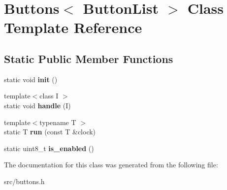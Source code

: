 \hypertarget{classButtons}{}\section{Buttons$<$ Button\+List $>$ Class Template Reference}
\label{classButtons}
\subsection*{Static Public Member Functions}
\begin{DoxyCompactItemize}
\item 
static void {\bfseries init} ()\hypertarget{classButtons_a9abcc4273029325408f8a0284434ffe7}{}\label{classButtons_a9abcc4273029325408f8a0284434ffe7}

\item 
{\footnotesize template$<$class I $>$ }\\static void {\bfseries handle} (I)\hypertarget{classButtons_a91d50739c18ae74d71e0c8821ecb3342}{}\label{classButtons_a91d50739c18ae74d71e0c8821ecb3342}

\item 
{\footnotesize template$<$typename T $>$ }\\static T {\bfseries run} (const T \&clock)\hypertarget{classButtons_a5bb6fe1fdc97ebebb5fc1670d69a5aa0}{}\label{classButtons_a5bb6fe1fdc97ebebb5fc1670d69a5aa0}

\item 
static uint8\+\_\+t {\bfseries is\+\_\+enabled} ()\hypertarget{classButtons_a6781d891c54de4b4ce1d27ec15a247c9}{}\label{classButtons_a6781d891c54de4b4ce1d27ec15a247c9}

\end{DoxyCompactItemize}


The documentation for this class was generated from the following file\+:\begin{DoxyCompactItemize}
\item 
src/buttons.\+h\end{DoxyCompactItemize}
